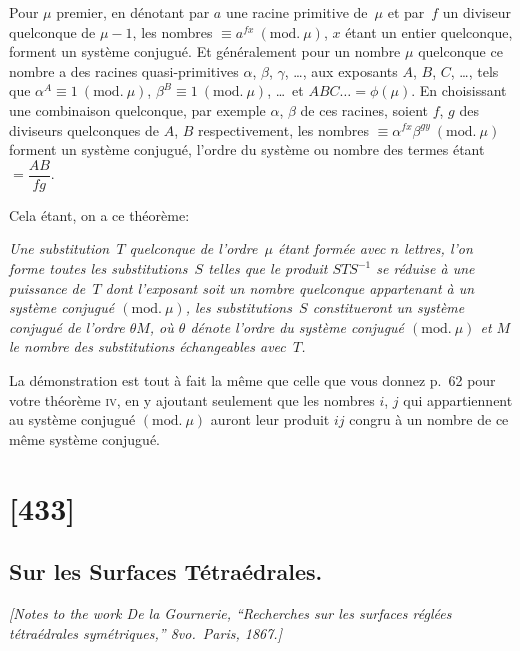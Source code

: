 \documentclass[11pt,a4paper]{article}
\theoremstyle{plain}
\theoremstyle{definition}
\begin{document}
Pour $\mu$ premier, en d\'enotant par $a$ une racine primitive de~$\mu$ et par~$f$ un
diviseur quelconque de $\mu - 1$, les nombres $\equiv a^{f x}\ (\mathrm{mod.}\ \mu)$, $x$ \'etant un entier quelconque,
forment un syst\`eme conjugu\'e.  Et g\'en\'eralement pour un nombre $\mu$ quelconque ce
nombre a des racines quasi-primitives $\alpha$, $\beta$, $\gamma$, \dots, aux exposants $A$, $B$, $C$, \dots, tels que
$\alpha^A \equiv 1\ (\mathrm{mod.}\ \mu)$, $\beta^B \equiv 1\ (\mathrm{mod.}\ \mu)$, \dots\ et $ABC \dots = \phi(\mu)$.  En choisissant une combinaison
quelconque, par exemple $\alpha$, $\beta$ de ces racines, soient $f$, $g$ des diviseurs quelconques de $A$, $B$
respectivement, les nombres $\equiv \alpha^{f x}\beta^{g y}\ (\mathrm{mod.}\ \mu)$ forment un syst\`eme conjugu\'e, l'ordre du
syst\`eme ou nombre des termes \'etant $= \dfrac{AB}{fg}$.

Cela \'etant, on a ce th\'eor\`eme:

\medskip
\textit{Une substitution~$T$ quelconque de l'ordre~$\mu$ \'etant form\'ee avec $n$ lettres, l'on forme
toutes les substitutions~$S$ telles que le produit $STS^{-1}$ se r\'eduise \`a une puissance de~$T$
dont l'exposant soit un nombre quelconque appartenant \`a un syst\`eme conjugu\'e $(\mathrm{mod.}\ \mu)$,
les substitutions~$S$ constitueront un syst\`eme conjugu\'e de l'ordre $\theta M$, o\`u $\theta$ d\'enote l'ordre
du syst\`eme conjugu\'e $(\mathrm{mod.}\ \mu)$ et $M$ le nombre des substitutions \'echangeables avec~$T$.}

\medskip
La d\'emonstration est tout \`a fait la m\^eme que celle que vous donnez p.~62 pour
votre th\'eor\`eme \textsc{iv}, en y ajoutant seulement que les nombres $i$, $j$ qui appartiennent
au syst\`eme conjugu\'e $(\mathrm{mod.}\ \mu)$ auront leur produit $ij$ congru \`a un nombre de ce m\^eme
syst\`eme conjugu\'e.

\clearpage

\section{[433]}
\subsection{Sur les Surfaces T\'etra\'edrales.}

\begin{center}
\textit{[Notes to the work De la Gournerie, ``Recherches sur les surfaces r\'egl\'ees t\'etra\'edrales
sym\'etriques,'' 8vo.\ Paris, 1867.]}
\end{center}
\end{document}
